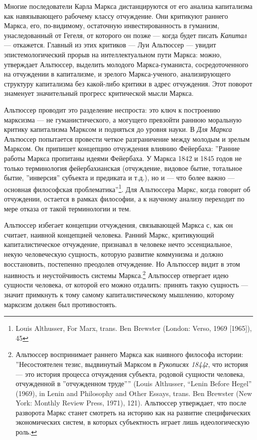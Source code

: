 \documentclass[12pt]{book}
\begin{document}
Многие последователи Карла Маркса дистанцируются от его анализа капитализма как навязывающего рабочему классу отчуждение. Они критикуют раннего Маркса, его, по-видимому, остаточную инвестированность в гуманизм, унаследованный от Гегеля, от которого он позже --- когда будет писать \textit{Капитал} --- откажется. Главный из этих критиков --- Луи Альтюссер --- увидит эпистемологический прорыв на интеллектуальном пути Маркса: можно, утверждает Альтюссер, выделить молодого Маркса-гуманиста, сосредоточенного на отчуждении в капитализме, и зрелого Маркса-ученого, анализирующего структуру капитализма без какой-либо критики в адрес отчуждения. Этот поворот знаменует значительный прогресс критической мысли Маркса.

Альтюссер проводит это разделение неспроста: это ключ к построению марксизма --- не гуманистического, а могущего превзойти раннюю моральную критику капитализма Марксом и подняться до уровня науки. В \textit{Для Маркса} Альтюссер попытается провести четкое разграничение между молодым и зрелым Марксом. Он припишет концепцию отчуждения влиянию Фейербаха: ''Ранние работы Маркса пропитаны идеями Фейербаха. У Маркса 1842 и 1845 годов не только терминология фейербахианская (отчуждение, видовое бытие, тотальное бытие, ''инверсия'' субъекта и предиката и т.д.), но и --- что более важно --- основная философская проблематика''\footnote{Louis Althusser, For Marx, trans. Ben Brewster (London: Verso, 1969 [1965]), 45}. Для Альтюссера Маркс, когда говорит об отчуждении, остается в рамках философии, а к научному анализу переходит по мере отказа от такой терминологии и тем.

Альтюссер избегает концепции отчуждения, связывающей Маркса с, как он считает, наивной концепцией человека. Ранний Маркс, критикующий капиталистическое отчуждение, признавал в человеке нечто эссенциальное, некую человеческую сущность, которую развитие коммунизма и должно восстановить, постепенно преодолев отчуждение. Но Альтюссер видит в этом наивность и неустойчивость системы Маркса.\footnote{Альтюссер воспринимает раннего Маркса как наивного философа истории: ''Несостоятелен тезис, выдвинутый Марксом в \textit{Рукописях 1844г}, что история --- это история процесса отчуждения субъекта, родовой сущности человека, отчужденной в ''отчужденном труде'''' (Louis Althusser, “Lenin Before Hegel” (1969), in Lenin and Philosophy and Other Essays, trans. Ben Brewster (New York: Monthly Review Press, 1971), 121). Альтюссер утверждает, что после разворота Маркс станет смотреть на историю как на развитие специфических экономических систем, в которых субъектность играет лишь идеологическую роль.} Альтюссер отвергает идею сущности человека, от которой его можно отдалить: принять такую сущность --- значит примкнуть к тому самому капиталистическому мышлению, которому марксизм должен был противостоять.
\end{document}
